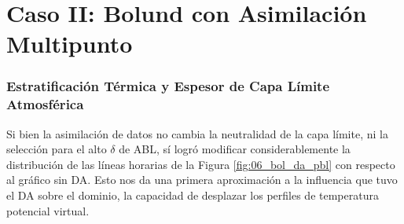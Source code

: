 \vspace*{\fill}
\newpage





























\section{Caso II: Bolund con Asimilación Multipunto}
\subsubsection{Estratificación Térmica y Espesor de Capa Límite Atmosférica}
Si bien la asimilación de datos no cambia la neutralidad de la capa límite, ni la selección para el alto $\delta$ de ABL, sí logró modificar considerablemente la distribución de las líneas horarias  de la Figura \ref{fig:06_bol_da_pbl} con respecto al gráfico sin DA. Esto nos da una primera aproximación a la influencia que tuvo el DA sobre el dominio, la capacidad de desplazar los perfiles de temperatura potencial virtual.

